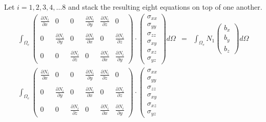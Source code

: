Let $i=1,2,3,4,\dots 8$ and stack the resulting eight equations on top of one another. 
\begin{eqnarray}
\int_{\Omega_e} 
\left(
\begin{array}{cccccc}
\frac{\partial N_i}{\partial x} & 0 & 0 & 
\frac{\partial N_i}{\partial y} & 
\frac{\partial N_i}{\partial z} & 0 \\  \\
0 & \frac{\partial N_i}{\partial y} &  0 & 
\frac{\partial N_i}{\partial x}  & 0 & \frac{\partial N_i}{\partial z} \\ \\
0 & 0 & \frac{\partial N_i}{\partial z} & 0 & 
\frac{\partial N_i}{\partial x} &  \frac{\partial N_i}{\partial y} 
\end{array}
\right)
\cdot
\left(
\begin{array}{c}
\sigma_{xx}\\
\sigma_{yy}\\
\sigma_{zz}\\
\sigma_{xy}\\
\sigma_{xz}\\
\sigma_{yz}
\end{array}
\right)
d\Omega &=& \int_{\Omega_e} N_1 
\left(
\begin{array}{c}
b_x \\ b_y \\ b_z
\end{array}
\right)
 d\Omega \nonumber\\
\int_{\Omega_e} 
\left(
\begin{array}{cccccc}
\frac{\partial N_i}{\partial x} & 0 & 0 & 
\frac{\partial N_i}{\partial y} & 
\frac{\partial N_i}{\partial z} & 0 \\  \\
0 & \frac{\partial N_i}{\partial y} &  0 & 
\frac{\partial N_i}{\partial x}  & 0 & \frac{\partial N_i}{\partial z} \\ \\
0 & 0 & \frac{\partial N_i}{\partial z} & 0 & 
\frac{\partial N_i}{\partial x} &  \frac{\partial N_i}{\partial y} 
\end{array}
\right)
\cdot
\left(
\begin{array}{c}
\sigma_{xx}\\
\sigma_{yy}\\
\sigma_{zz}\\
\sigma_{xy}\\
\sigma_{xz}\\
\sigma_{yz}
\end{array}

\end{eqnarray}
